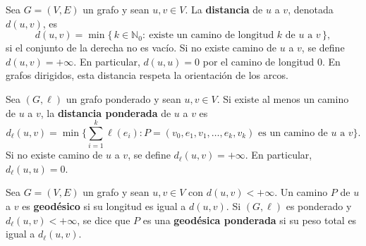             \begin{definicion}[Distancia]
                Sea $G=(V,E)$ un grafo y sean $u,v\in V$. La \textbf{distancia} de $u$ a $v$, denotada $d(u,v)$, es
                \[
                d(u,v)=\min\{\,k\in\mathbb{N}_0:\ \text{existe un camino de longitud }k\text{ de }u\text{ a }v\,\},
                \]
                si el conjunto de la derecha no es vacío. Si no existe camino de $u$ a $v$, se define $d(u,v)=+\infty$. En particular, $d(u,u)=0$ por el camino de longitud $0$. En grafos dirigidos, esta distancia respeta la orientación de los arcos.
            \end{definicion}

            \begin{definicion}
                Sea $(G,\ell)$ un grafo ponderado y sean $u,v\in V$. Si existe al menos un camino de $u$ a $v$, la \textbf{distancia ponderada} de $u$ a $v$ es
                \[
                d_\ell(u,v)=
                \min\Big\{
                    \sum_{i=1}^k \ell(e_i):
                    P=(v_0,e_1,v_1,\dots,e_k,v_k)
                    \text{ es un camino de }u\text{ a }v
                \Big\}.
                \]
                Si no existe camino de $u$ a $v$, se define $d_\ell(u,v)=+\infty$. En particular, $d_\ell(u,u)=0$.
            \end{definicion}

            \begin{definicion}[Geodésica]
                Sea $G=(V,E)$ un grafo y sean $u,v\in V$ con $d(u,v)<+\infty$. Un camino $P$ de $u$ a $v$ es \textbf{geodésico} si su longitud es igual a $d(u,v)$. Si $(G,\ell)$ es ponderado y $d_\ell(u,v)<+\infty$, se dice que $P$ es una \textbf{geodésica ponderada} si su peso total es igual a $d_\ell(u,v)$.
            \end{definicion}

